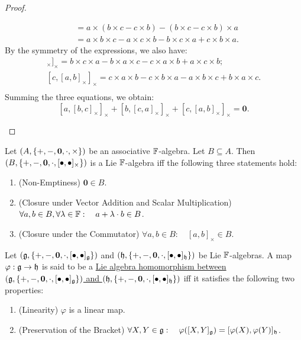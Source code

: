 \documentclass[11pt,reqno]{amsart}
\renewcommand{\phi}{\varphi}
\begin{document}
\begin{proof}
\begin{enumerate}
\[\begin{aligned}
&=a\times(b\times c-c\times b)-(b\times c-c\times b)\times a\\
&=a\times b\times c-a\times c\times b-b\times c\times a+c\times b\times a.
\end{aligned}\]
By the symmetry of the expressions, we also have:
\begin{gather*}
[b,[c,a]_\times]_\times
=b\times c\times a-b\times a\times c-c\times a\times b+a\times c\times b;\\
[c,[a,b]_\times]_\times
=c\times a\times b-c\times b\times a-a\times b\times c+b\times a\times c.\\
\end{gather*}
Summing the three equations, we obtain:
\[
[a,[b,c]_\times]_\times+
[b,[c,a]_\times]_\times+
[c,[a,b]_\times]_\times=\bm0.
\]
\end{enumerate}
\end{proof}


\begin{corollary}\label{cor:Lie-subalg-associative}
Let $(A,\set{+,-,\bm0,\cdot,\times})$ be an associative $\mathbb{F}$-algebra.
Let $B\subseteq A$.
Then $\Br{B,\set{+,-,\bm0,\cdot,[\bullet,\bullet]_\times}}$ is a Lie $\mathbb{F}$-algebra iff the following three statements hold:
\begin{enumerate}
\item (Non-Emptiness) $\bm0\in B$.
\item (Closure under Vector Addition and Scalar Multiplication)
$\forall a,b\in B,\forall\lambda\in\mathbb{F}:\quad a+\lambda\cdot b\in B$.
\item (Closure under the Commutator)
$\forall a,b\in B:\quad [a,b]_\times\in B$.
\end{enumerate}
\end{corollary}

\begin{Def}
Let $\Br{\g,\set{+,-,\bm0,\cdot,[\bullet,\bullet]_\g}}$ and
$\Br{\h,\set{+,-,\bm0,\cdot,[\bullet,\bullet]_\h}}$ be Lie $\mathbb{F}$-algebras.
A map $\phi:\g\to\h$ is said to be a
\ul{Lie algebra homomorphism between
$\Br{\g,\set{+,-,\bm0,\cdot,[\bullet,\bullet]_\g}}$
and $\Br{\h,\set{+,-,\bm0,\cdot,[\bullet,\bullet]_\h}}$} iff it satisfies
the following two properties:
\begin{enumerate}
\item (Linearity) $\phi$ is a linear map.
\item (Preservation of the Bracket)
$\forall X,Y\in\g:\quad\phi\Br{[X,Y]_\g}=[\phi(X),\phi(Y)]_\h$.
\end{enumerate}
\end{Def}
\end{document}
